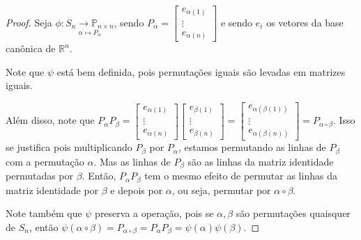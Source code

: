	\begin{proof}
		Seja $\phi: \underset{\alpha\mapsto P_{\alpha}}{S_n\to\mathbb{P}_{n\times n}}$, sendo $\displaystyle{P_{\alpha} = \begin{bmatrix}
			e_{\alpha(1)} \\
			\vdots \\
			e_{\alpha(n)}
			\end{bmatrix}}$ e sendo $e_i$ os vetores da base canônica de $\mathbb{R}^n$.
		
		\par\vspace{0.3cm}
		
		Note que $\psi$ está bem definida, pois permutações iguais são levadas em matrizes iguais.
		
		\par\vspace{0.3cm}
		
		Além disso, note que $\displaystyle{ P_{\alpha}P_{\beta} = \begin{bmatrix}
			e_{\alpha(1)} \\
			\vdots \\
			e_{\alpha(n)}
			\end{bmatrix}\begin{bmatrix}
			e_{\beta(1)} \\
			\vdots \\
			e_{\beta(n)}
			\end{bmatrix} = \begin{bmatrix}
			e_{\alpha(\beta(1))} \\
			\vdots \\
			e_{\alpha(\beta(n))}
			\end{bmatrix} = P_{\alpha\circ\beta} }$. Isso se justifica pois multiplicando $P_{\beta}$ por $P_{\alpha}$, estamos permutando as linhas de $P_{\beta}$ com a permutação $\alpha$. Mas as linhas de $P_{\beta}$ são as linhas da matriz identidade permutadas por $\beta$. Então, $P_{\alpha}P_{\beta}$ tem o mesmo efeito de permutar as linhas da matriz identidade por $\beta$ e depois por $\alpha$, ou seja, permutar por $\alpha\circ\beta$. 
		
		\par\vspace{0.3cm}
		
		Note também que $\psi$ preserva a operação, pois se $\alpha, \beta$ são permutações quaisquer de $S_n$, então $\psi(\alpha\circ\beta) = P_{\alpha\circ\beta} = P_{\alpha}P_{\beta} = \psi(\alpha)\psi(\beta)$.
		

\end{proof}
